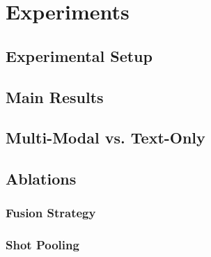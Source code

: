 \documentclass{article}
\begin{document}
\section{Experiments}

\subsection{Experimental Setup}

\subsection{Main Results}

\subsection{Multi-Modal vs. Text-Only}

\subsection{Ablations}

\subsubsection{Fusion Strategy}

\subsubsection{Shot Pooling}
\end{document}
